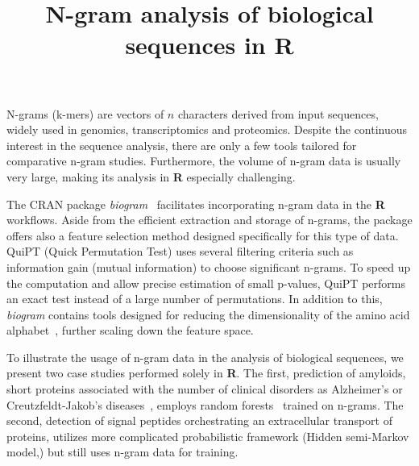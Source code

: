 \documentclass[a4paper,10pt]{article}
\title{N-gram analysis of biological sequences in R}
\author{}
\date{}
\begin{document}
\maketitle

N-grams (k-mers) are vectors of $n$ characters derived from input sequences, 
widely used in genomics, transcriptomics and proteomics. Despite the continuous 
interest in the sequence analysis, there are only a few tools tailored for 
comparative n-gram studies. Furthermore, the volume of n-gram data is usually 
very large, making its analysis in \textbf{R} especially challenging. 

The CRAN package \textit{biogram}~\citep{burdukiewicz_biogram:_2015} facilitates 
incorporating n-gram data in the \textbf{R} workflows. Aside from the efficient 
extraction and storage of n-grams, the package offers also a feature selection 
method designed specifically for this type of data. QuiPT (Quick Permutation 
Test) uses several filtering criteria such as information gain (mutual 
information) to choose significant n-grams. To speed up the computation and 
allow precise estimation of small p-values, QuiPT performs an exact test instead 
of a large number of permutations. In addition to this, \textit{biogram} 
contains tools designed for reducing the dimensionality of the amino acid 
alphabet~\citep{murphy_simplified_2000}, further scaling down the feature space.

To illustrate the usage of n-gram data in the analysis of biological sequences,  
we present two case studies performed solely in \textbf{R}. The first,   
prediction of amyloids, short proteins associated with the number of clinical   
disorders as Alzheimer's or Creutzfeldt-Jakob’s 
diseases~\citep{fandrich_oligomeric_2012}, employs random 
forests~\citep{wright_ranger:_2015} trained on n-grams. The second, detection   
of signal peptides orchestrating an extracellular transport of proteins, 
utilizes more complicated probabilistic framework (Hidden semi-Markov 
model,) but still uses n-gram data for training. 


\end{document}
